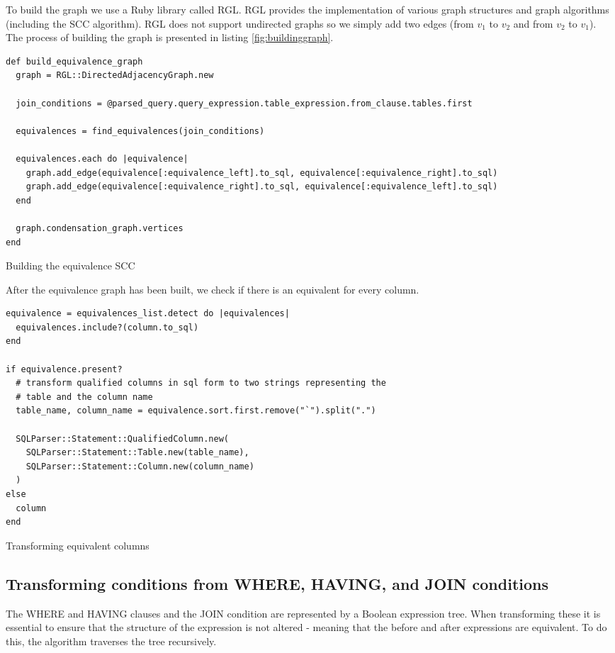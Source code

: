 To build the graph we use a Ruby library called RGL. RGL provides the implementation of various graph structures and graph algorithms (including the SCC algorithm). RGL does not support undirected graphs so we simply add two edges (from $v_1$ to $v_2$ and from $v_2$ to $v_1$). The process of building the graph is presented in listing \ref{fig:buildinggraph}.

\begin{code}
\begin{verbatim}
def build_equivalence_graph
  graph = RGL::DirectedAdjacencyGraph.new

  join_conditions = @parsed_query.query_expression.table_expression.from_clause.tables.first

  equivalences = find_equivalences(join_conditions)

  equivalences.each do |equivalence|
    graph.add_edge(equivalence[:equivalence_left].to_sql, equivalence[:equivalence_right].to_sql)
    graph.add_edge(equivalence[:equivalence_right].to_sql, equivalence[:equivalence_left].to_sql)
  end

  graph.condensation_graph.vertices
end
\end{verbatim}
\caption{Building the equivalence SCC}
\label{fig:buildinggraph}
\end{code}

After the equivalence graph has been built, we check if there is an equivalent for every column.

\begin{code}
\begin{verbatim}
equivalence = equivalences_list.detect do |equivalences|
  equivalences.include?(column.to_sql)
end

if equivalence.present?
  # transform qualified columns in sql form to two strings representing the
  # table and the column name
  table_name, column_name = equivalence.sort.first.remove("`").split(".")

  SQLParser::Statement::QualifiedColumn.new(
    SQLParser::Statement::Table.new(table_name),
    SQLParser::Statement::Column.new(column_name)
  )
else
  column
end
\end{verbatim}
\caption{Transforming equivalent columns}
\end{code}

\subsection{Transforming conditions from WHERE, HAVING, and JOIN conditions}
The WHERE and HAVING clauses and the JOIN condition are represented by a Boolean expression tree. When transforming these it is essential to ensure that the structure of the expression is not altered - meaning that the before and after expressions are equivalent. To do this, the algorithm traverses the tree recursively.

